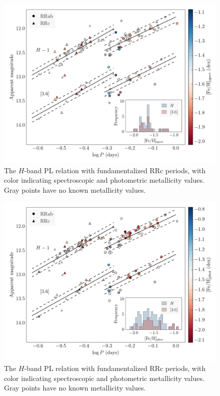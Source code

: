 \documentclass[a4paper,fleqn,usenatbib]{mnras}
\begin{document}
\begin{figure}
\begin{center}
\includegraphics[width=160mm]{reworked_fitting_code/final_plots/spect_color_PL.pdf}
\caption{The $H$-band PL relation with fundamentalized RRc periods, with color indicating spectroscopic \citep[top]{2006ApJ...640L..43S} and photometric \citep[bottom]{2000AJ....119.1824R} metallicity values. Gray points have no known metallicity values.}
\label{fig:hband}
\end{center}
\end{figure}

\begin{figure}
\begin{center}
\includegraphics[width=160mm]{reworked_fitting_code/final_plots/phot_color_PL.pdf}
\caption{The $H$-band PL relation with fundamentalized RRc periods, with color indicating spectroscopic \citep[top]{2006ApJ...640L..43S} and photometric \citep[bottom]{2000AJ....119.1824R} metallicity values. Gray points have no known metallicity values.}
\label{fig:hband}
\end{center}
\end{figure}
\end{document}

